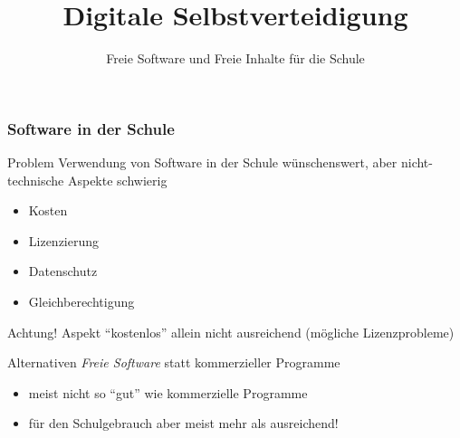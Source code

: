 \documentclass{beamer}
\begin{document}
\title{Digitale Selbstverteidigung}
\subtitle{Freie Software und Freie Inhalte für die Schule}

\maketitle

\begin{frame}
  \frametitle{Software in der Schule}

  \onslide<+->

  \begin{block}{Problem}
    Verwendung von Software in der Schule wünschenswert, aber
    nicht-technische Aspekte schwierig
    \begin{itemize}
    \item Kosten
    \item Lizenzierung
    \item Datenschutz
    \item Gleichberechtigung
    \end{itemize}
  \end{block}

  \onslide<+->

  \begin{block}{Achtung!}
    Aspekt \enquote{kostenlos} allein nicht ausreichend (mögliche
    Lizenzprobleme)
  \end{block}

  \onslide<+->

  \begin{block}{Alternativen}
    \emph{Freie Software} statt kommerzieller Programme
    \begin{itemize}
    \item meist nicht so \enquote{gut} wie kommerzielle Programme
    \item für den Schulgebrauch aber meist mehr als ausreichend!
    \end{itemize}
  \end{block}

\end{frame}
\end{document}
